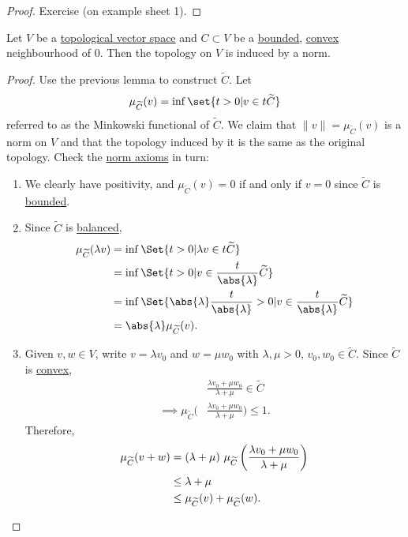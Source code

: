 \documentclass{article}
\begin{document}
\begin{proof}
    Exercise (on example sheet 1).
\end{proof}

\begin{prop}
    Let $V$ be a \hyperlink{def:tVS}{topological vector space} and $C \subset V$ be a \hyperlink{def:boundedSubs}{bounded}, \hyperlink{def:convexSubs}{convex} neighbourhood of $0$. Then the topology on $V$ is induced by a norm.
\end{prop}

\begin{proof}
    Use the previous lemma to construct $\widetilde C$. Let
    \begin{equation*}
        \mu_{\widetilde C}(v) = \inf\set{t > 0 | v \in t \widetilde C}
    \end{equation*}
    referred to as the Minkowski functional of $\widetilde C$.
    We claim that $\|v\| = \mu_{\widetilde C}(v)$ is a norm on $V$ and that the topology induced by it is the same as the original topology.
    Check the \hyperlink{def:nvs}{norm axioms} in turn:
    \begin{enumerate}[label=\roman*.]
        \item We clearly have positivity, and $\mu_{\widetilde C}(v) = 0$ if and only if $v = 0$ since $\widetilde C$ is \hyperlink{def:boundedSubs}{bounded}.
        \item Since $\widetilde C$ is \hyperlink{def:balancedSubs}{balanced},
            \begin{align*}
                \mu_{\widetilde C} (\lambda v) &= \inf\Set{t > 0 | \lambda v \in t \widetilde C} \\
                &= \inf\Set{t > 0 | v \in \frac{t}{\abs{\lambda}} \widetilde C} \\
                &= \inf\Set{\abs{\lambda} \frac{t}{\abs{\lambda}} > 0 | v \in \frac{t}{\abs{\lambda}} \widetilde C} \\
                &= \abs{\lambda} \mu_{\widetilde C}(v).
            \end{align*}
        \item Given $v, w \in V$, write $v = \lambda v_0$ and $w = \mu w_0$ with $\lambda, \mu > 0$, $v_0, w_0 \in \widetilde C$.
            Since $\widetilde C$ is \hyperlink{def:convexSubs}{convex},
            \begin{align*}
                &\frac{\lambda v_0 + \mu w_0}{\lambda + \mu} \in \widetilde C \\
                \implies \mu_{\widetilde C} \bigg(&\frac{\lambda v_0 + \mu w_0}{\lambda + \mu}\bigg) \leq 1.
            \end{align*}
            Therefore,
            \begin{align*}
                \mu_{\widetilde C} (v + w) &= (\lambda + \mu) \ \mu_{\widetilde C} \left(\frac{\lambda v_0 + \mu w_0}{\lambda + \mu}\right) \\
                &\leq \lambda + \mu \\
                &\leq \mu_{\widetilde C}(v) + \mu_{\widetilde C}(w). \qedhere
            \end{align*}
    \end{enumerate}
\end{proof}
\end{document}
